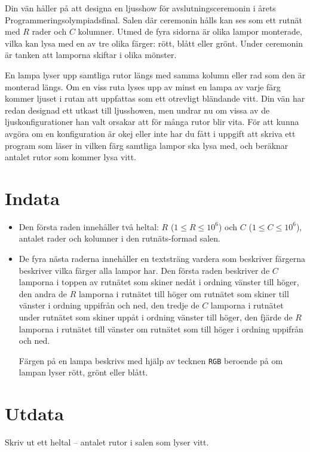 Din vän håller på att designa en ljusshow för avslutningsceremonin i årets Programmeringsolympiadsfinal.
Salen där ceremonin hålls kan ses som ett rutnät med $R$ rader och $C$ kolumner.
Utmed de fyra sidorna är olika lampor monterade, vilka kan lysa med en av tre olika färger: rött, blått eller grönt.
Under ceremonin är tanken att lamporna skiftar i olika mönster.

En lampa lyser upp samtliga rutor längs med samma kolumn eller rad som den är monterad längs.
Om en viss ruta lyses upp av minst en lampa av varje färg kommer ljuset i rutan att uppfattas som ett otrevligt bländande vitt.
Din vän har redan designad ett utkast till ljusshowen, men undrar nu om vissa av de ljuskonfigurationer han valt orsakar att för många rutor blir vita.
För att kunna avgöra om en konfiguration är okej eller inte har du fått i uppgift att skriva ett program som läser in vilken färg samtliga lampor ska lysa med, och beräknar antalet rutor som kommer lysa vitt.

\section*{Indata}
\begin{itemize}
  \item
    Den första raden innehåller två heltal: $R$ ($1 \le R \le 10^6$) och $C$ ($1 \le C \le 10^6$), antalet rader och kolumner i den rutnäts-formad salen.

  \item
    De fyra nästa raderna innehåller en textsträng vardera som beskriver färgerna beskriver vilka färger alla lampor har.
    Den första raden beskriver de $C$ lamporna i toppen av rutnätet som skiner nedåt i ordning vänster till höger,
        den andra de $R$ lamporna i rutnätet till höger om rutnätet som skiner till vänster i ordning uppifrån och ned,
        den tredje de $C$ lamporna i rutnätet under rutnätet som skiner uppåt i ordning vänster till höger,
        den fjärde de $R$ lamporna i rutnätet till vänster om rutnätet som till höger i ordning uppifrån och ned.

    Färgen på en lampa beskrivs med hjälp av tecknen \texttt{RGB} beroende på om lampan lyser rött, grönt eller blått.
\end{itemize}

\section*{Utdata}
Skriv ut ett heltal -- antalet rutor i salen som lyser vitt.

